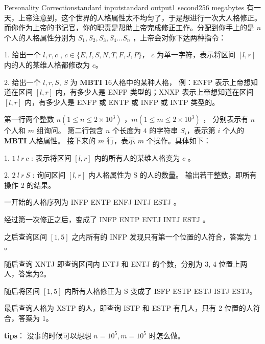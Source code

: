 \documentclass[12pt,a4paper,oneside]{article}
\begin{document}
\begin{problem}{Personality Correction}{standard input}{standard output}{1 second}{256 megabytes}
    有一天，上帝注意到，这个世界的人格属性太不均匀了，于是想进行一次大人格修正。而你作为上帝的书记官，你的职责是帮助上帝完成修正工作。分配到你手上的是 $n$ 个人的人格属性分别为 $S_1, S_2, S_3, S_4 ... S_n$ ，上帝会对你下达两种指令：

        1. 给出一个 $l, r, c$ , $c \in \{E, I, S, N, T, F, J, P \}$， $c$ 为单一字符，表示将区间 $[l, r]$ 内的人的某维人格都修改为 $c$。
        
        2. 给出一个 $l, r, S$,  $S$ 为 \textbf{MBTI} 16人格中的某种人格， 例：ENFP 表示上帝想知道在区间 $[l,r]$ 内，有多少人是 ENFP 类型的；XNXP 表示上帝想知道在区间 $[l, r]$ 内，有多少人是 ENFP 或 ENTP 或 INFP 或 INTP 类型的。
	
	\InputFile
	第一行两个整数 $n (1 \leq n \leq 2 \times 10^3)$ ，$m (1 \leq      m \leq 2 \times 10^3)$ ， 分别表示有 $n$ 个人和 $m$ 组询问。
        第二行包含 $n$ 个长度为 $4$ 的字符串 $S_i$，表示第 $i$ 个人的 \textbf{MBTI} 人格属性。
        接下来的 $m$ 行，表示 $m$ 个操作。具体如下：
        
            1.  $1 \ l \ r \ c$ : 表示将区间 $[l, r]$ 内的所有人的某维人格变为 $c$ 。
            
            2.  $2 \ l \ r \ S$ : 询问区间 $[l, r]$ 内人格属性为 S 的人的数量。
        \OutputFile
	输出若干整数，即所有操作 2 的结果。
	\Example
	
	\begin{example}
	\end{example}

    \Explanations
    一开始的人格序列为 INFP ENTP ENFJ INTJ ESTJ 。
    
    经过第一次修正之后，变成了 INFP ENTP ENTJ INTJ ESTJ 。
    
    之后查询区间 $[1,5]$ 之内所有的 INFP 发现只有第一个位置的人符合，答案为 1 。
    
    随后查询 XNTJ 即查询区间内 INTJ  和 ENTJ 的个数，分别为 3, 4 位置上两人，答案为2。
    
    随后将区间 $[1, 5]$ 内所有人格修正为 S  变成了 ISFP ESTP ESTJ ISTJ ESTJ。
    
    最后查询人格为 XSTP 的人，即查询 ISTP 和 ESTP 有几人，只有 2 位置的人符合，答案为 1。

    \textbf{tips}：
    没事的时候可以想想 $n = 10^5,m = 10^5$ 时怎么做。
	
\end{problem}
	
\end{document}
